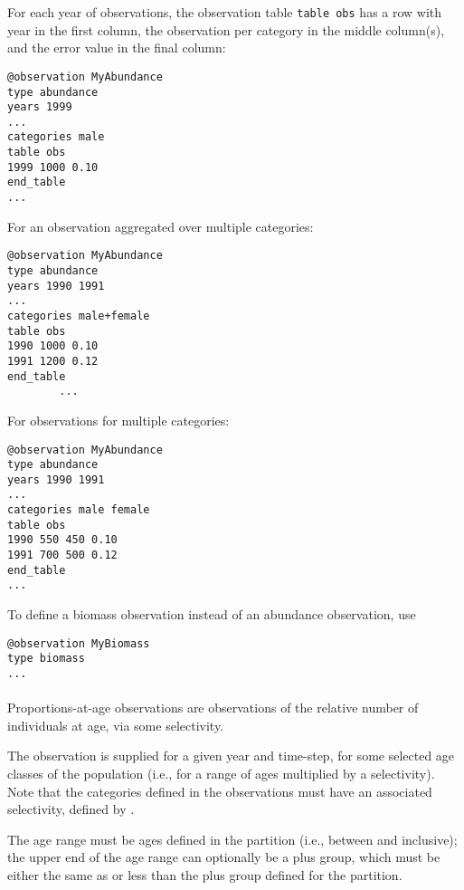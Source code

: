 For each year of observations, the observation table \texttt{table obs} has a row with year in the first column, the observation per category in the middle column(s), and the error value in the final column:

{\small{\begin{verbatim}
@observation MyAbundance
type abundance
years 1999
...
categories male
table obs
1999 1000 0.10
end_table
...
\end{verbatim}}}

For an observation aggregated over multiple categories:

{\small{\begin{verbatim}
@observation MyAbundance
type abundance
years 1990 1991
...
categories male+female
table obs
1990 1000 0.10
1991 1200 0.12
end_table
		...
\end{verbatim}}}

For observations for multiple categories:

{\small{\begin{verbatim}
@observation MyAbundance
type abundance
years 1990 1991
...
categories male female
table obs
1990 550 450 0.10
1991 700 500 0.12
end_table
...
\end{verbatim}}}

To define a biomass observation instead of an abundance observation, use

{\small{\begin{verbatim}
@observation MyBiomass
type biomass
...
\end{verbatim}}}
\ifAgeBased

\paragraph*{}\label{sec:Observation-ProportionsAtAge}

Proportions-at-age observations are observations of the relative number of individuals at age, via some selectivity.

The observation is supplied for a given year and time-step, for some selected age classes of the population (i.e., for a range of ages multiplied by a selectivity). Note that the categories defined in the observations must have an associated selectivity, defined by .

The age range must be ages defined in the partition (i.e., between  and  inclusive); the upper end of the age range can optionally be a plus group, which must be either the same as or less than the plus group defined for the partition.

